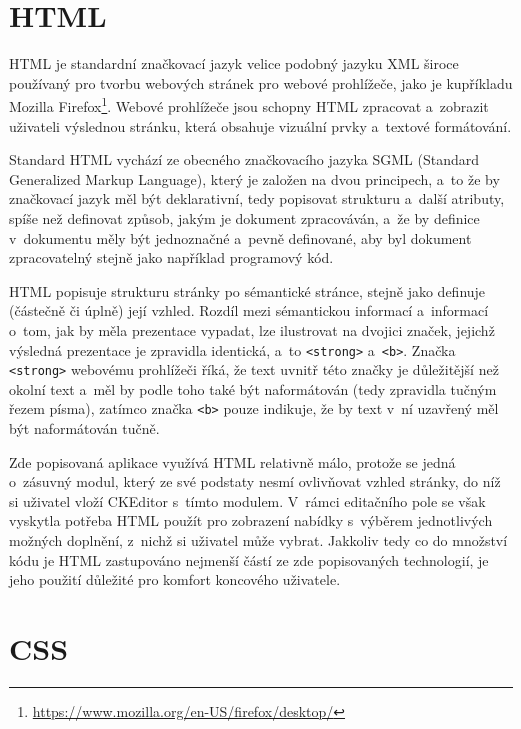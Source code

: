 \documentclass[a4paper,11pt,openany]{book} %
\begin{document}
\begin{spacing}{1.05}
\section{HTML}

HTML je standardní značkovací jazyk velice podobný jazyku XML široce používaný pro tvorbu webových stránek pro webové prohlížeče, jako je kupříkladu Mozilla Firefox\footnote{\url{https://www.mozilla.org/en-US/firefox/desktop/}}. Webové prohlížeče jsou schopny HTML zpracovat a~zobrazit uživateli výslednou stránku, která obsahuje vizuální prvky a~textové formátování. \parencite[19--22]{raggett1999html}

Standard HTML vychází ze obecného značkovacího jazyka SGML (Standard Generalized Markup Language), který je založen na dvou principech, a~to že by značkovací jazyk měl být deklarativní, tedy popisovat strukturu a~další atributy, spíše než definovat způsob, jakým je dokument zpracováván, a~že by definice v~dokumentu měly být jednoznačné a~pevně definované, aby byl dokument zpracovatelný stejně jako například programový kód. \parencite{rubinsky1990sgml} %


HTML popisuje strukturu stránky po sémantické stránce, stejně jako definuje (částečně či úplně) její vzhled. Rozdíl mezi sémantickou informací a~informací o~tom, jak by měla prezentace vypadat, lze ilustrovat na dvojici značek, jejichž výsledná prezentace je zpravidla identická, a~to {\tt <strong>} a~{\tt <b>}. Značka {\tt <strong>} webovému prohlížeči říká, že text uvnitř této značky je důležitější než okolní text a~měl by podle toho také být naformátován (tedy zpravidla tučným řezem písma), zatímco značka {\tt <b>} pouze indikuje, že by text v~ní uzavřený měl být naformátován tučně. %


Zde popisovaná aplikace využívá HTML relativně málo, protože se jedná o~zásuvný modul, který ze své podstaty nesmí ovlivňovat vzhled stránky, do níž si uživatel vloží CKEditor s~tímto modulem. V~rámci editačního pole se však vyskytla potřeba HTML použít pro zobrazení nabídky s~výběrem jednotlivých možných doplnění, z~nichž si uživatel může vybrat. Jakkoliv tedy co do množství kódu je HTML zastupováno nejmenší částí ze zde popisovaných technologií, je jeho použití důležité pro komfort koncového uživatele.

\section{CSS}


\end{spacing}
\end{document}
